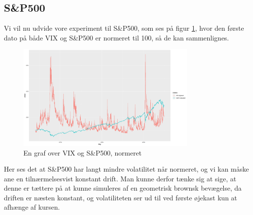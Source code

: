 \documentclass{article}
\theoremstyle{definition}
\theoremstyle{remark}
\begin{document}
\subsection{S\&P500}
Vi vil nu udvide vore experiment til S\&P500, som ses på figur \ref{fig:VIXSP500}, hvor den første dato på både VIX og S\&P500 er normeret til 100, så de kan sammenlignes.
\begin{figure}
    \centering
    \includegraphics[width=3.5in]{SP500_vs_VIX.png}
    \caption{En graf over VIX og S\&P500, normeret}
    \label{fig:VIXSP500}
\end{figure}
Her ses det at S\&P500 har langt mindre volatilitet når normeret, og vi kan måske ane en tilnærmelsesvist konstant drift. Man kunne derfor tænke sig at sige, at denne er tættere på at kunne simuleres af en geometrisk brownsk bevægelse, da driften er næsten konstant, og volatiliteten ser ud til ved første øjekast kun at afhænge af kursen.
\end{document}
